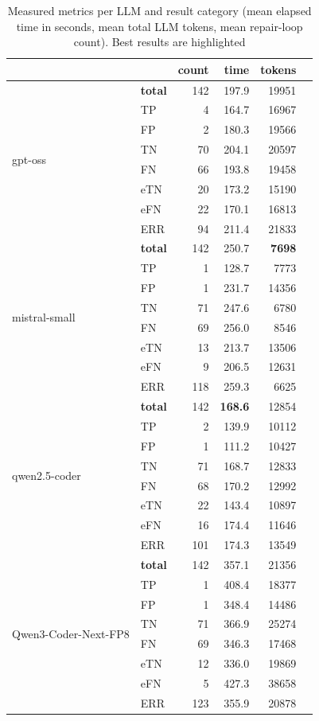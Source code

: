 \begin{table}
   \centering
   \caption{Measured metrics per LLM and result category (mean elapsed time in seconds, mean total LLM tokens, mean repair-loop count). Best results are highlighted}\label{tab:resources}
\begin{tabular}{@{}llrrrr@{}}
\toprule
 &  & count & time & tokens \\ \midrule
\multirow{8}{*}{gpt-oss}
 & \textbf{total} & 142 & 197.9 & 19951 \\
 & TP & 4 & 164.7 & 16967 \\
 & FP & 2 & 180.3 & 19566 \\
 & TN & 70 & 204.1 & 20597 \\
 & FN & 66 & 193.8 & 19458 \\
 & eTN & 20 & 173.2 & 15190 \\
 & eFN & 22 & 170.1 & 16813 \\
 & ERR & 94 & 211.4 & 21833 \\
 \midrule
 \multirow{8}{*}{mistral-small} 
 & \textbf{total} & 142 & 250.7 & \textbf{7698} \\
 & TP & 1 & 128.7 & 7773 \\
 & FP & 1 & 231.7 & 14356 \\
 & TN & 71 & 247.6 & 6780 \\
 & FN & 69 & 256.0 & 8546 \\
 & eTN & 13 & 213.7 & 13506 \\
 & eFN & 9 & 206.5 & 12631 \\
 & ERR & 118 & 259.3 & 6625 \\
 \midrule
 \multirow{8}{*}{qwen2.5-coder}
 & \textbf{total} & 142 & \textbf{168.6} & 12854 \\
 & TP & 2 & 139.9 & 10112 \\
 & FP & 1 & 111.2 & 10427 \\
 & TN & 71 & 168.7 & 12833 \\
 & FN & 68 & 170.2 & 12992 \\
 & eTN & 22 & 143.4 & 10897 \\
 & eFN & 16 & 174.4 & 11646 \\
 & ERR & 101 & 174.3 & 13549 \\
 \midrule
 \multirow{8}{*}{Qwen3-Coder-Next-FP8}
 & \textbf{total} & 142 & 357.1 & 21356 \\
 & TP & 1 & 408.4 & 18377 \\
 & FP & 1 & 348.4 & 14486 \\
 & TN & 71 & 366.9 & 25274 \\
 & FN & 69 & 346.3 & 17468 \\
 & eTN & 12 & 336.0 & 19869 \\
 & eFN & 5 & 427.3 & 38658 \\
 & ERR & 123 & 355.9 & 20878 \\
 \bottomrule
\end{tabular}
\end{table}

